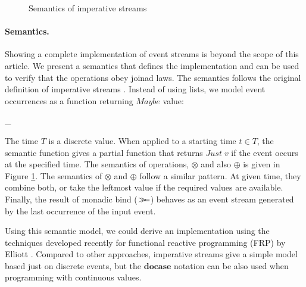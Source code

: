 \documentclass{sigplanconf}
\makeatletter
\newcommand{\Conid}[1]{\mathit{#1}}
\newcommand{\Varid}[1]{\mathit{#1}}
\newcommand{\anonymous}{\kern0.06em \vbox{\hrule\@width.5em}}
\newcommand{\bind}{\mathbin{>\!\!\!>\mkern-6.7mu=}}
\def\resethooks{%
  \global\let\SaveRestoreHook\empty
  \global\let\ColumnHook\empty}
\newcommand{\hsindent}[1]{\quad}%
\let\hspre\empty
\let\hspost\empty
\makeatother
\begin{document}
\begin{figure}
\resethooks
\caption{Semantics of imperative streams}
\label{fig:imperativestream-semantics}
\end{figure}

\paragraph{Semantics.} Showing a complete implementation of event streams is beyond the scope of
this article. We present a semantics that defines the implementation and can be used to verify 
that the operations obey joinad laws. The semantics follows the original definition of imperative 
streams \cite{imperative-streams}. Instead of using lists, we model event occurrences as a 
function returning \ensuremath{\Conid{Maybe}} value:

\begin{hscode}\SaveRestoreHook
\column{B}{@{}>{\hspre}l<{\hspost}@{}}%
\column{E}{@{}>{\hspre}l<{\hspost}@{}}%
\>[B]{} \mathopen{\llbracket} \Conid{Evt}\;\Varid{a}\mathclose{\rrbracket}  _{\Conid{T}}\mathbin{::}\Conid{T}\to \Conid{Maybe}\;\Varid{a}{}\<[E]%
\ColumnHook
\end{hscode}\resethooks
The time $T$ is a discrete value. When applied to a starting time $t \in T$, the semantic function 
gives a partial function that returns \ensuremath{\Conid{Just}\;\Varid{v}} if the event occurs at the specified time.
The semantics of  operations, \ensuremath{\otimes} and also \ensuremath{\oplus} is given in 
Figure \ref{fig:imperativestream-semantics}.
The semantics of \ensuremath{\otimes} and \ensuremath{\oplus} follow a similar pattern. At given time, they combine 
both, or take the leftmost value if the required values are available. Finally, the result of monadic
bind (\ensuremath{\bind }) behaves as an event stream generated by the last occurrence of the input event.

Using this semantic model, we could derive an implementation using the techniques developed recently 
for functional reactive programming (FRP) by Elliott \cite{push-pull-frp}. Compared to other 
approaches, imperative streams give a simple model based just on discrete events, but the \ensuremath{\mathbf{docase}}
notation can be also used when programming with continuous values.
\end{document}
